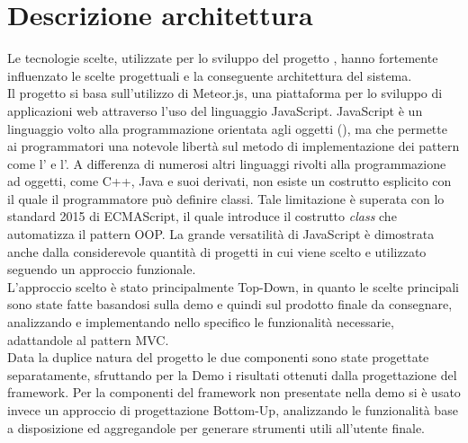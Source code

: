 \section{Descrizione architettura}
Le tecnologie scelte, utilizzate per lo sviluppo del progetto \ProjectName{}, hanno fortemente influenzato le scelte progettuali e la conseguente architettura del sistema.\\

Il progetto si basa sull'utilizzo di Meteor.js, una piattaforma per lo sviluppo di applicazioni web attraverso l'uso del linguaggio JavaScript. JavaScript è un linguaggio volto alla programmazione orientata agli oggetti (), ma che permette ai programmatori una notevole libertà sul metodo di implementazione dei pattern come l' e l'. A differenza di numerosi altri linguaggi rivolti alla programmazione ad oggetti, come C++, Java e suoi derivati, non esiste un costrutto esplicito con il quale il programmatore può definire classi. Tale limitazione è superata con lo standard 2015 di ECMAScript, il quale introduce il costrutto \textit{class} che automatizza il pattern OOP. La grande versatilità di JavaScript è dimostrata anche dalla considerevole quantità di progetti in cui viene scelto e utilizzato seguendo un approccio funzionale.\\

L'approccio scelto è stato principalmente Top-Down, in quanto le scelte principali sono state fatte basandosi sulla demo \DemoName{} e quindi sul prodotto finale da consegnare, analizzando e implementando nello specifico le funzionalità necessarie, adattandole al pattern MVC.\\

Data la duplice natura del progetto le due componenti sono state progettate separatamente, sfruttando per la Demo i risultati ottenuti dalla progettazione del framework. Per la componenti del framework non presentate nella demo si è usato invece un approccio di progettazione Bottom-Up, analizzando le funzionalità base a disposizione ed aggregandole per generare strumenti utili all'utente finale.